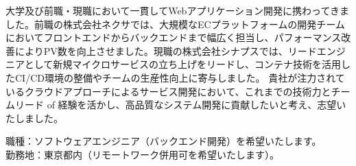 \documentclass[10pt]{article}
\begin{document}
\begin{CJK*}{UTF8}{min}
\vspace{0.3cm}

\noindent
\begin{tcolorbox}[
  colback=white,
  colframe=gridgray,
  coltitle=brandblue,
  fonttitle=\bfseries,
  title=志望動機、自己PR、アピールポイントなど,
  boxrule=0.5pt,
  sharp corners,
  left=6pt, right=6pt, top=6pt, bottom=6pt
]
  大学及び前職・現職において一貫してWebアプリケーション開発に携わってきました。前職の株式会社ネクサでは、大規模なECプラットフォームの開発チームにおいてフロントエンドからバックエンドまで幅広く担当し、パフォーマンス改善によりPV数を向上させました。現職の株式会社シナプスでは、リードエンジニアとして新規マイクロサービスの立ち上げをリードし、コンテナ技術を活用したCI/CD環境の整備やチームの生産性向上に寄与しました。
  貴社が注力されているクラウドアプローチによるサービス開発において、これまでの技術力とチームリード of 経験を活かし、高品質なシステム開発に貢献したいと考え、志望いたしました。
\end{tcolorbox}

\vspace{0.2cm}

\noindent
\begin{tcolorbox}[
  colback=white,
  colframe=gridgray,
  coltitle=brandblue,
  fonttitle=\bfseries,
  title=本人希望記入欄（特に待遇・職種・勤務地等に対して希望がある場合に記入）,
  boxrule=0.5pt,
  sharp corners,
  left=6pt, right=6pt, top=6pt, bottom=6pt
]
  職種：ソフトウェアエンジニア（バックエンド開発）を希望いたします。\\
  勤務地：東京都内（リモートワーク併用可を希望いたします）。
\end{tcolorbox}

\end{CJK*}
\end{document}
